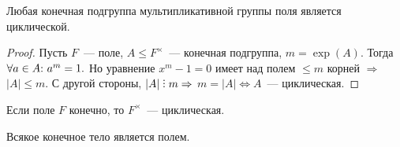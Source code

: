         \begin{statement}
            Любая конечная подгруппа мультипликативной группы поля является циклической.
        \end{statement}
        \begin{proof}
            Пусть $F$~--- поле, ${A \leqslant F^\times}$~--- конечная подгруппа, ${m = \exp(A).}$ Тогда ${\forall a \in A{:}{ } \  a^m = 1.}$ Но уравнение ${x^m - 1 = 0}$ имеет над полем ${\leqslant m}$ корней $\Rightarrow$ ${|A| \leqslant m}$. С другой стороны, ${|A| \divby m \Rightarrow}$ ${m = |A| \Leftrightarrow A}$~--- циклическая.
        \end{proof}
        \begin{consequence*}
            Если поле $F$ конечно, то $F^\times$~--- циклическая.
        \end{consequence*}
        \begin{theorem*}
            Всякое конечное тело является полем.
        \end{theorem*}